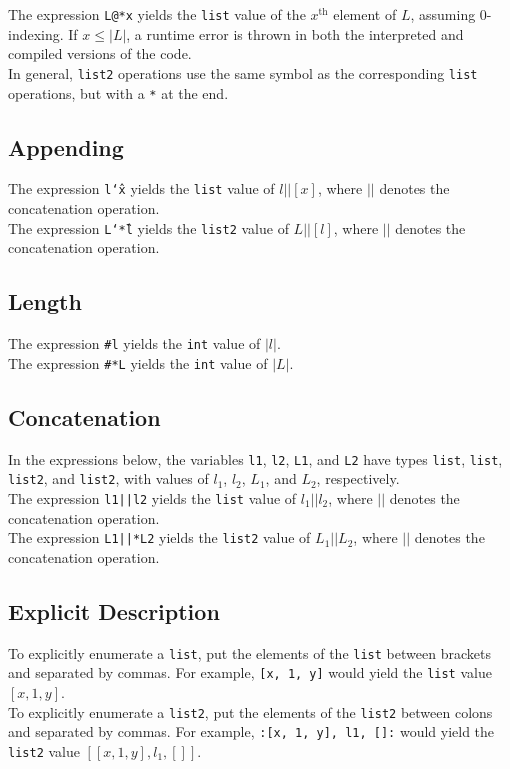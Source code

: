 \documentclass[11pt]{article}
\begin{document}
The expression \texttt{L@*x} yields the \texttt{list} value of the $x^{\textrm{th}}$ element of $L$, assuming 0-indexing. If $x\le |L|$, a runtime error is thrown in both the interpreted and compiled versions of the code. \\

In general, \texttt{list2} operations use the same symbol as the corresponding \texttt{list} operations, but with a \texttt{*} at the end.

\subsection{Appending}

The expression \texttt{l\char`\^x} yields the \texttt{list} value of $l||[x]$, where $||$ denotes the concatenation operation. \\

The expression \texttt{L\char`\^*l} yields the \texttt{list2} value of $L||[l]$, where $||$ denotes the concatenation operation.

\subsection{Length} 

The expression \texttt{\#l} yields the \texttt{int} value of $|l|$. \\

The expression \texttt{\#*L} yields the \texttt{int} value of $|L|$. 

\subsection{Concatenation}

In the expressions below, the variables \texttt{l1}, \texttt{l2}, \texttt{L1}, and \texttt{L2} have types \texttt{list}, \texttt{list}, \texttt{list2}, and \texttt{list2}, with values of $l_1$, $l_2$, $L_1$, and $L_2$, respectively. \\

The expression \texttt{l1||l2} yields the \texttt{list} value of $l_1||l_2$, where $||$ denotes the concatenation operation. \\

The expression \texttt{L1||*L2} yields the \texttt{list2} value of $L_1||L_2$, where $||$ denotes the concatenation operation.

\subsection{Explicit Description}

To explicitly enumerate a \texttt{list}, put the elements of the \texttt{list} between brackets and separated by commas. For example, \texttt{[x, 1, y]} would yield the \texttt{list} value $[x, 1, y]$. \\

To explicitly enumerate a \texttt{list2}, put the elements of the \texttt{list2} between colons and separated by commas. For example, \texttt{:[x, 1, y], l1, []:} would yield the \texttt{list2} value $[[x, 1, y], l_1, []]$.
\end{document}

